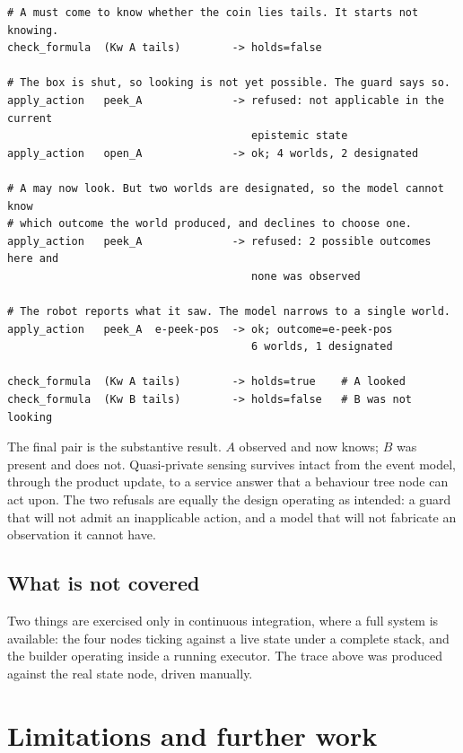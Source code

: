 \documentclass[11pt,a4paper]{article}
\theoremstyle{definition}
\begin{document}
\begin{lstlisting}[caption={Service responses, in order.}]
# A must come to know whether the coin lies tails. It starts not knowing.
check_formula  (Kw A tails)        -> holds=false

# The box is shut, so looking is not yet possible. The guard says so.
apply_action   peek_A              -> refused: not applicable in the current
                                      epistemic state
apply_action   open_A              -> ok; 4 worlds, 2 designated

# A may now look. But two worlds are designated, so the model cannot know
# which outcome the world produced, and declines to choose one.
apply_action   peek_A              -> refused: 2 possible outcomes here and
                                      none was observed

# The robot reports what it saw. The model narrows to a single world.
apply_action   peek_A  e-peek-pos  -> ok; outcome=e-peek-pos
                                      6 worlds, 1 designated

check_formula  (Kw A tails)        -> holds=true    # A looked
check_formula  (Kw B tails)        -> holds=false   # B was not looking
\end{lstlisting}

The final pair is the substantive result. $A$ observed and now knows; $B$ was
present and does not. Quasi-private sensing survives intact from the event model,
through the product update, to a service answer that a behaviour tree node can
act upon. The two refusals are equally the design operating as intended: a guard
that will not admit an inapplicable action, and a model that will not fabricate
an observation it cannot have.

\subsection{What is not covered}

Two things are exercised only in continuous integration, where a full system is
available: the four nodes ticking against a live state under a complete stack,
and the builder operating inside a running executor. The trace above was produced
against the real state node, driven manually.

\section{Limitations and further work}
\end{document}

